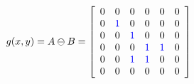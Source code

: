 \documentclass[varwidth=true]{standalone}
\begin{document}
\[
	g(x,y) = A \ominus B = \left[\begin{array}{*6{c}}
    0 & 0 & 0 & 0 & 0 & 0 \\
    0 & \color{blue}{1} & 0 & 0 & 0 & 0 \\
    0 & 0 & \color{blue}{1} & 0 & 0 & 0 \\
    0 & 0 & 0 & \color{blue}{1} & \color{blue}{1} & 0 \\
    0 & 0 & \color{blue}{1} & \color{blue}{1} & 0 & 0  \\
    0 & 0 & 0 & 0 & 0 & 0 
  \end{array}\right]
\]

\end{document}

